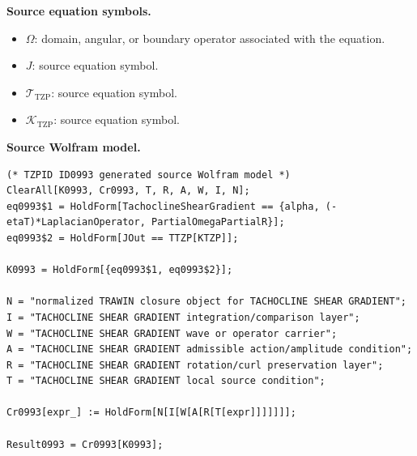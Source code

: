 \begin{minipage}[t]{0.49\linewidth}
\begingroup
\small
\raggedright
\textbf{Source equation symbols.}\par
\begin{itemize}[leftmargin=1.35em,itemsep=1pt,topsep=1pt,parsep=0pt]
    \item $\Omega$: domain, angular, or boundary operator associated with the equation.
    \item $J$: source equation symbol.
    \item $\mathcal{T}_{\mathrm{TZP}}$: source equation symbol.
    \item $\mathcal{K}_{\mathrm{TZP}}$: source equation symbol.
\end{itemize}
\endgroup
\end{minipage}\hfill
\begin{minipage}[t]{0.47\linewidth}
\begingroup
\scriptsize
\raggedright
\textbf{Source Wolfram model.}\par
\begin{Verbatim}[fontsize=\tiny,breaklines=true,breakanywhere=true]
(* TZPID ID0993 generated source Wolfram model *)
ClearAll[K0993, Cr0993, T, R, A, W, I, N];
eq0993$1 = HoldForm[TachoclineShearGradient == {alpha, (-etaT)*LaplacianOperator, PartialOmegaPartialR}];
eq0993$2 = HoldForm[JOut == TTZP[KTZP]];

K0993 = HoldForm[{eq0993$1, eq0993$2}];

N = "normalized TRAWIN closure object for TACHOCLINE SHEAR GRADIENT";
I = "TACHOCLINE SHEAR GRADIENT integration/comparison layer";
W = "TACHOCLINE SHEAR GRADIENT wave or operator carrier";
A = "TACHOCLINE SHEAR GRADIENT admissible action/amplitude condition";
R = "TACHOCLINE SHEAR GRADIENT rotation/curl preservation layer";
T = "TACHOCLINE SHEAR GRADIENT local source condition";

Cr0993[expr_] := HoldForm[N[I[W[A[R[T[expr]]]]]]];

Result0993 = Cr0993[K0993];
\end{Verbatim}
\endgroup
\end{minipage}

